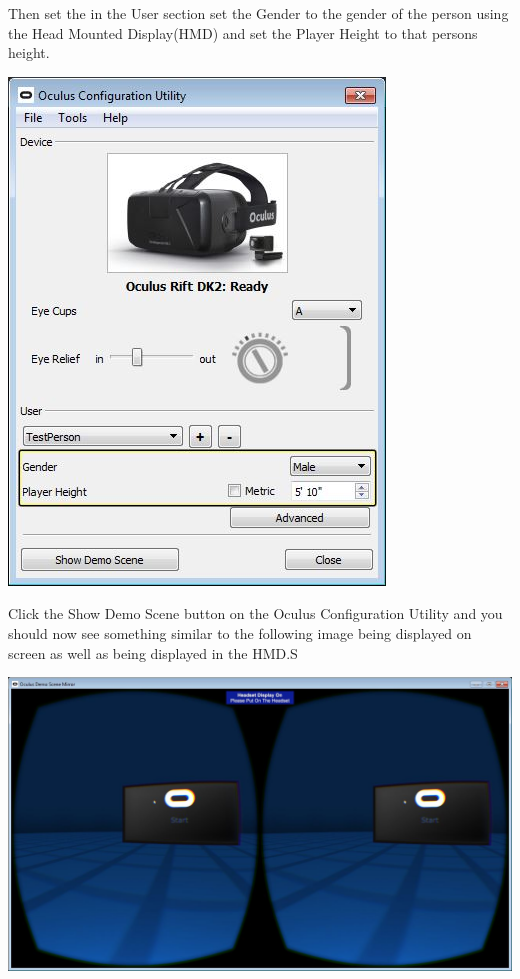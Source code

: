 Then set the in the User section set the Gender to the gender of the person using the Head Mounted Display(HMD) and set the Player Height to that persons height.
\begin{center}
\centering
\includegraphics[scale=0.75]{Oculus_Config_Setup_Profile}\\
\end{center}
Click the Show Demo Scene button on the Oculus Configuration Utility and you should now see something similar to the following image being displayed on screen as well as being displayed in the HMD.S
\begin{center}
\centering
\includegraphics[scale=0.35]{Oculus_Config_Demo_Sceen}\\
\end{center}


